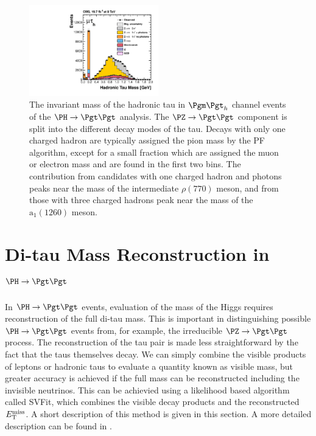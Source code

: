 \begin{figure}[htb]
\begin{center}
    \includegraphics[width=0.5\textwidth]
      {plots/reco/m_2_tau_modes_mt_2012.pdf}
\end{center}
\caption{The invariant mass of the hadronic tau in $\mutau$ channel events of
the $\PH\to\Pgt\Pgt$ analysis. The $\PZ\to\Pgt\Pgt$ component is split into the
different decay modes of the tau. Decays with only one charged hadron are
typically assigned the pion mass by the \ac{PF} algorithm, except for a small
fraction which are assigned the muon or electron mass and are found in the first
two bins. The contribution from candidates with one charged hadron and photons
peaks near the mass of the intermediate $\rho(770)$ meson, and from those with
three charged hadrons peak near the mass of the $\text{a}_{1}(1260)$ meson.}
\label{fig:taumass}
\end{figure}

\section{Di-tau Mass Reconstruction in $\PH \to \Pgt\Pgt$}
\label{sec:svfit}

In $\PH \to \Pgt\Pgt$ events, evaluation of the mass of the Higgs requires reconstruction of the 
full di-tau mass. This is important in distinguishing possible $\PH\to\Pgt\Pgt$
events from, for example, the irreducible $\PZ \to \Pgt\Pgt$ process. 
The reconstruction of the tau pair is made less straightforward
by the fact that the taus themselves decay. We can simply combine the visible
products of leptons or hadronic taus to evaluate a quantity known as visible mass,
but greater accuracy is achieved if the full mass can be reconstructed including the
invisible neutrinos. This can be achievied using a likelihood based algorithm called
SVFit, which combines the visible decay products and the reconstructed $E_{\mathrm{T}}^{\text{miss}}$. A
short description of this method is given in this section. A more detailed
description can be found in \cite{HIG-13-004}.

